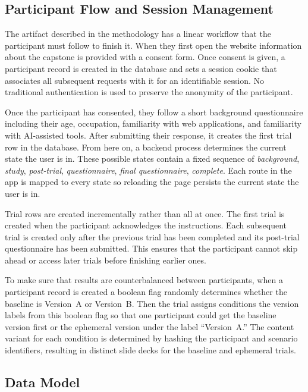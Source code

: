 \subsection{Participant Flow and Session Management}

The artifact described in the methodology has a linear workflow that the participant must follow to finish it. When they first open the website information about the capstone is provided with a consent form. Once consent is given, a participant record is created in the database and sets a session cookie that associates all subsequent requests with it for an identifiable session. No traditional authentication is used to preserve the anonymity of the participant. 

Once the participant has consented, they follow a short background questionnaire including their age, occupation, familiarity with web applications, and familiarity with AI-assisted tools. After submitting their response, it creates the first trial row in the database. From here on, a backend process determines the current state the user is in. These possible states contain a fixed sequence of \emph{background}, \emph{study}, \emph{post-trial}, \emph{questionnaire}, \emph{final questionnaire}, \emph{complete}. Each route in the app is mapped to every state so reloading the page persists the current state the user is in.

Trial rows are created incrementally rather than all at once. The first trial is created when the participant acknowledges the instructions. Each subsequent trial is created only after the previous trial has been completed and its post-trial questionnaire has been submitted. This ensures that the participant cannot skip ahead or access later trials before finishing earlier ones.

To make sure that results are counterbalanced between participants, when a participant record is created a boolean flag randomly determines whether the baseline is Version~A or Version~B. Then the trial assigns conditions the version labels from this boolean flag so that one participant could get the baseline version first or the ephemeral version under the label ``Version~A.'' The content variant for each condition is determined by hashing the participant and scenario identifiers, resulting in distinct slide decks for the baseline and ephemeral trials.

\subsection{Data Model}


